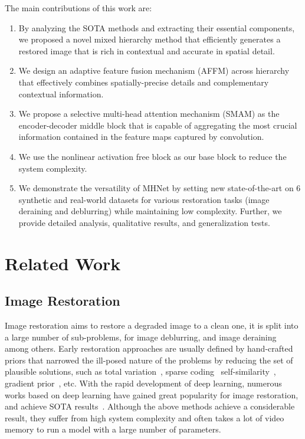\documentclass[lettersize,journal]{IEEEtran}
\begin{document}
The main contributions of this work are:
\begin{enumerate}
	\item By analyzing the SOTA methods and extracting their essential components, we proposed a novel mixed hierarchy method that efficiently generates a restored image that is rich in contextual and accurate in spatial detail.
    \item We design an adaptive feature fusion mechanism (AFFM) across hierarchy that effectively combines spatially-precise details and complementary contextual information.
	\item We propose a selective multi-head attention mechanism (SMAM) as the encoder-decoder middle block that is capable of aggregating the  most crucial information contained in the feature maps captured by convolution.
    \item We use the nonlinear activation free block as our base block to reduce the system complexity.
    \item We demonstrate the versatility of MHNet by setting new state-of-the-art on 6 synthetic and real-world datasets for various restoration tasks (image deraining and deblurring) while maintaining low complexity. Further, we provide detailed analysis, qualitative results, and generalization tests.
\end{enumerate}
\section{Related Work}
\label{sec:1}

\subsection{Image Restoration}
Image restoration aims to restore a degraded image to a clean one, it is split into a large number of sub-problems, for image deblurring, and image deraining among others. Early restoration approaches are  usually defined by hand-crafted priors that narrowed the ill-posed nature of the problems by reducing the set of plausible solutions, such as total variation~\cite{1992Nonlinear,Chan1998TotalVB}, sparse coding~\cite{2015Removing,20060K,2007Sparse} self-similarity~\cite{2005A,2007Image}, gradient prior~\cite{2008High,2013Unnatural}, etc. With the rapid development of deep learning, numerous works based on deep learning have gained great popularity for image restoration, and achieve SOTA results~\cite{Zamir2021MPRNet,zhang2023accurate,Zamir2021Restormer,Chen_2021_CVPR,Tsai2022Stripformer,chu2021tlc}. Although the above methods achieve a considerable result, they suffer from high system complexity and often takes a lot of video memory to run a model with a large number of parameters.
\end{document}
